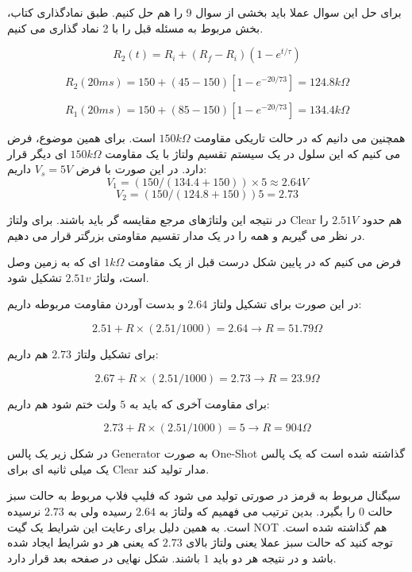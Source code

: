 \documentclass[12pt]{article}
\begin{document}
برای حل این سوال عملا باید بخشی از سوال 9 را هم حل کنیم. طبق نمادگذاری کتاب، بخش مربوط به مسئله قبل را با 2 نماد گذاری می کنیم.

$$R_{2}(t) = R_i + (R_f - R_i)(1 - e^{t/\tau})$$

$$R_2(20ms) = 150 +(45-150)[1-e^{-20/73}] = 124.8k\Omega$$

$$R_1(20ms) = 150 +(85-150)[1-e^{-20/73}] = 134.4 k\Omega$$

همچنین می دانیم که در حالت تاریکی مقاومت $150k\Omega$ است. برای همین موضوع، فرض می کنیم که این سلول در یک سیستم تقسیم ولتاژ با یک مقاومت $150k\Omega$ ای دیگر قرار دارد. در این صورت با فرض $V_s = 5V$ داریم:
$$V_1 =(150 / (134.4 + 150))\times 5 \approx 2.64 V$$
$$V_2 = (150/(124.8+150))5 = 2.73$$

در نتیجه این ولتاژهای مرجع مقایسه گر باید باشند. برای ولتاژ Clear هم حدود $2.51V$ را در نظر می گیریم و همه را در یک مدار تقسیم مقاومتی بزرگتر قرار می دهیم.

فرض می کنیم که در پایین شکل درست قبل از یک مقاومت $1k\Omega$ ای که به زمین وصل است، ولتاژ $2.51v$ تشکیل شود.

در این صورت برای تشکیل ولتاژ $2.64$ و بدست آوردن مقاومت مربوطه داریم:

$$2.51 + R \times (2.51/1000) = 2.64 \rightarrow R=51.79 \Omega$$

برای تشکیل ولتاژ $2.73$ هم داریم:

$$2.67 + R \times(2.51/1000) =2.73 \rightarrow R= 23.9 \Omega$$

برای مقاومت آخری که باید به $5$ ولت ختم شود هم داریم:

$$2.73 + R \times (2.51/1000) = 5 \rightarrow R = 904 \Omega$$

در شکل زیر یک پالس Generator به صورت One-Shot گذاشته شده است که یک پالس یک میلی ثانیه ای برای Clear مدار تولید کند.

سیگنال مربوط به قرمز در صورتی تولید می شود که فلیپ فلاپ مربوط به حالت سبز حالت $0$ را بگیرد. بدین ترتیب می فهمیم که ولتاژ به $2.64$ رسیده ولی به $2.73$ نرسیده است. به همین دلیل برای رعایت این شرایط یک گیت NOT هم گذاشته شده است. توجه کنید که حالت سبز عملا یعنی ولتاژ بالای $2.73$ که یعنی هر دو شرایط ایجاد شده باشد و در نتیجه هر دو باید $1$ باشند. شکل نهایی در صفحه بعد قرار دارد.
\end{document}
